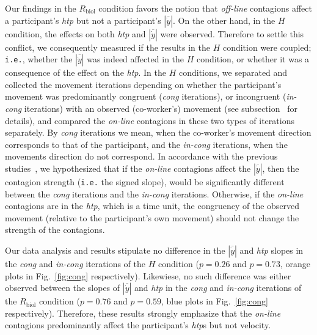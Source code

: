 Our findings in the $R_{\text{biol}}$ condition favors the notion that \textit{off-line} contagions affect a participant's {\it htp} but not a participant's $|\overline{\dot{y}}|$. On the other hand, in the $H$ condition, the effects on both {\it htp} and $|\overline{\dot{y}}|$ were observed. Therefore to settle this conflict, we consequently measured if the results in the $H$ condition were coupled; \texttt{i.e.}, whether the $|\overline{\dot{y}}|$ was indeed affected in the $H$ condition, or whether it was a consequence of the effect on the {\it htp}. In the $H$ conditions, we separated and collected the movement iterations depending on whether the participant's movement was predominantly congruent ({\it cong} iterations), or incongruent ({\it in-cong} iterations) with an observed (co-worker's) movement (see subsection~ for details), and compared the {\it on-line} contagions in these two types of iterations separately. By {\it cong} iterations we mean, when the co-worker's movement direction corresponds to that of the participant, and the {\it in-cong} iterations, when the movements direction do not correspond. In accordance with the previous studies~\cite{ Kilner:SocialNeuro:2007, Bisio:PlosOne:2010, Noy:B&C:2009}, we hypothesized that if the \textit{on-line} contagions affect the $|\overline{\dot{y}}|$, then the contagion strength (\texttt{i.e.} the signed slope), would be significantly different between the {\it cong} iterations and the {\it in-cong} iterations. Otherwise, if the {\it on-line} contagions are in the {\it htp}, which is a time unit, the congruency of the observed movement (relative to the participant's own movement) should not change the strength of the contagions.

Our data analysis and results stipulate no difference in the $|\overline{\dot{y}}|$ and {\it htp} slopes in the {\it cong} and {\it in-cong} iterations of the $H$ condition ($p = 0.26$ and $p = 0.73$, orange plots in Fig.~\ref{fig:cong} respectively). Likewiese, no such difference was either observed between the slopes of $|\overline{\dot{y}}|$  and {\it htp} in the {\it cong} and {\it in-cong} iterations of the $R_{\text{biol}}$ condition ($p = 0.76$ and $p = 0.59$, blue plots in Fig.~\ref{fig:cong} respectively). Therefore, these results strongly emphasize that the \textit{on-line} contagions predominantly affect the participant's {\it htp}s but not velocity.



